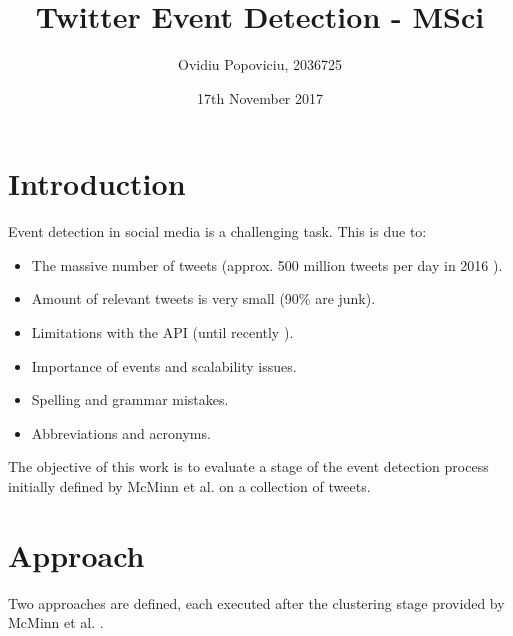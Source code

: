\documentclass[a4paper,portrait,12pt]{article}
\begin{document}
\setlength{\oddsidemargin}{0.9847in-1in}
\setlength{\textwidth}{\paperwidth - 0.9847in-0.9847in}

\author{Ovidiu Popoviciu, 2036725}
\date{17th November 2017}
\title{Twitter Event Detection - MSci}
\maketitle

\section{Introduction}

Event detection in social media is a challenging task.
This is due to: 
\begin{itemize}
	\item The massive number of tweets (approx. 500 million tweets per day in 2016 \cite{tweetStats}).
	\item Amount of relevant tweets is very small (90\% are junk).
	\item Limitations with the API (until recently \cite{twitterPremium}).
	\item Importance of events and scalability issues.
	\item Spelling and grammar mistakes.
	\item Abbreviations and acronyms.
\end{itemize}

The objective of this work is to evaluate a stage of the event detection process initially defined by McMinn et al. \cite{McMinn2013} \cite{McMinn2015} on a collection of tweets.

\section{Approach}
\cite{McMinn2013} \cite{McMinn2015}

Two approaches are defined, each executed after the clustering stage provided by McMinn et al. \cite{McMinn2013}.
\end{document}
